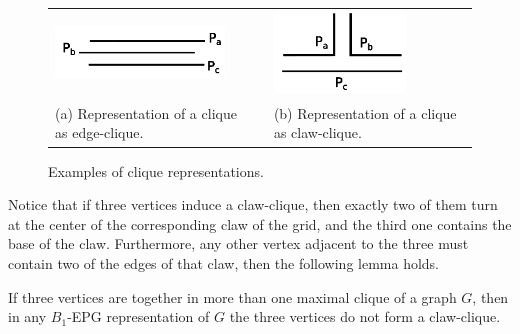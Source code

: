 \documentclass{dmgt}
\begin{document}
    
%    
\begin{figure}[h]
  \centering
  \begin{tabular}{  p{4cm} p{0.7cm} p{4cm} }
    \includegraphics[width=4.5cm]{edge-clique.png} & &
    \includegraphics[width=3.5cm]{claw-clique.png}
    \\
    \footnotesize %
    (a)  \footnotesize Representation of a clique as edge-clique. && \footnotesize (b) Representation  of a clique as claw-clique.\\
  \end{tabular}

 \caption{Examples of clique representations.} \label{fig:cliquesRepresentation}
\end{figure}


Notice that if three vertices induce a claw-clique, then exactly two of them turn at the center of the corresponding  claw of the grid, and the third one contains the
base of the claw. 
Furthermore, any other vertex  adjacent to the three  must contain two of the edges of that claw, then the following lemma holds.

\begin{lemma}\label{lem:cliquesMaximais}
If three vertices are together  in more than one maximal clique of a graph $G$, then in
any $B_1$-EPG representation of $G$ the three vertices do not form a claw-clique. %
\end{lemma}

%
 
\end{document}
